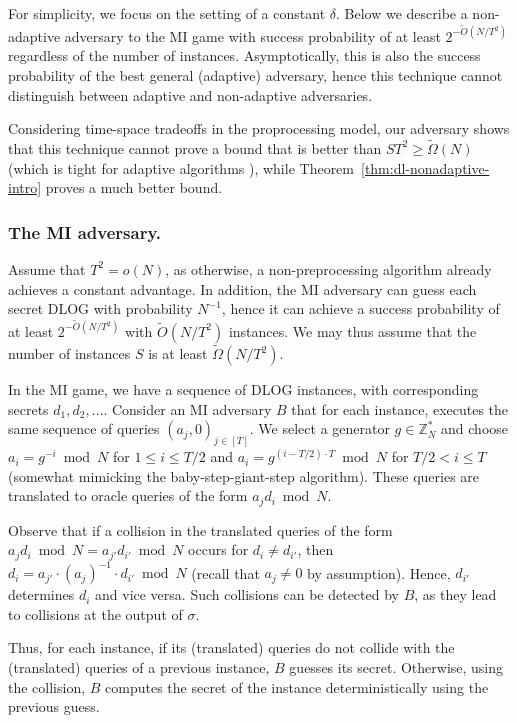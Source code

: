 \documentclass[11pt]{article}
\begin{document}
For simplicity, we focus on the setting of a constant $\delta$.
Below we describe a non-adaptive adversary to the MI game with success probability of at least
$2^{-\tilde{O}(N/T^2)}$
regardless of the number of instances.
Asymptotically, this is also the success probability of the best general (adaptive) adversary, hence this technique cannot distinguish between adaptive and non-adaptive adversaries. 

Considering time-space tradeoffs in the proprocessing model, 
our adversary shows that this technique cannot prove a bound that is better than
$S T^2 \geq \tilde{\Omega}(N)$
(which is tight for adaptive algorithms \cite{Corrigan-GibbsK18}), while Theorem~\ref{thm:dl-nonadaptive-intro} proves a much better bound.

\subsubsection*{The MI adversary.} 
Assume that $T^2 = o(N)$, as otherwise, a non-preprocessing algorithm already achieves a constant advantage.
In addition, the MI adversary can guess each secret DLOG with probability $N^{-1}$,
hence it can achieve a success probability of at least
$2^{-\tilde{O}(N/T^2)}$
with $\tilde{O}(N/T^2)$ instances.  
We may thus assume that the number of instances $S$ is at least 
$\tilde{\Omega}(N/T^2)$.

In the MI game, we have a sequence of DLOG instances, with corresponding secrets $d_1,d_2,\ldots$.
Consider an MI adversary $B$ that for each instance, executes the same sequence of queries $(a_j,0)_{j\in [T]}$. We select a generator $g \in \mathbb{Z}_N^{*}$ and choose $a_i = g^{-i} \bmod N$ for $1 \leq i \leq T/2$
and $a_i = g^{(i - T/2) \cdot T} \bmod N$ for $T/2 < i \leq T$ (somewhat mimicking the baby-step-giant-step algorithm).
These queries are translated to oracle queries of the form $a_j d_i \bmod N$.

Observe that if a collision in the translated queries of the form 
$a_j d_i \bmod N = a_{j'} d_{i'}\bmod N$
occurs for $d_i \neq d_{i'}$,
then 
$d_i = a_{j'} \cdot (a_j)^{-1} \cdot d_{i'} \bmod N$
(recall that $a_j \neq 0$ by assumption).
Hence, $d_{i'}$ determines $d_i$ and vice versa.
Such collisions can be detected by $B$,
as they lead to collisions at the output of $\sigma$.

Thus, for each instance, if its (translated) queries do not collide with the (translated) queries of a previous instance, $B$ guesses its secret. Otherwise, using the collision, $B$ computes the secret of the instance deterministically using the previous guess.
\end{document}

